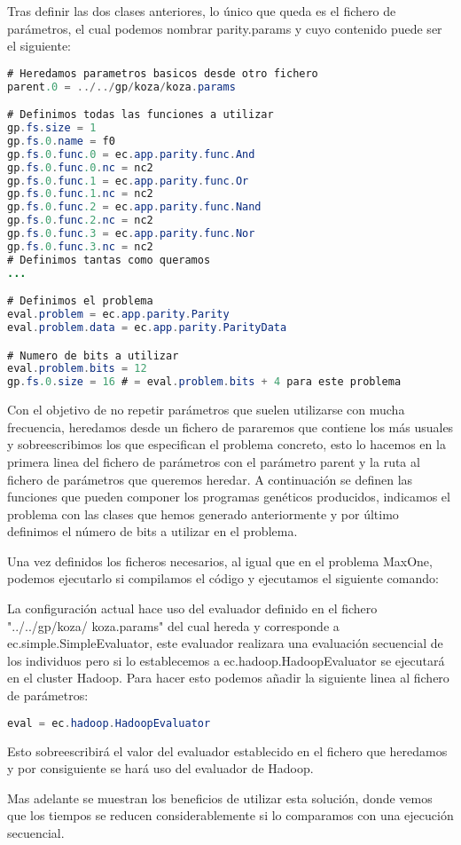 Tras definir las dos clases anteriores, lo único que queda es el fichero de parámetros, el cual podemos nombrar parity.params y cuyo contenido puede ser el siguiente:

\begin{lstlisting}[language=Java]
# Heredamos parametros basicos desde otro fichero
parent.0 = ../../gp/koza/koza.params

# Definimos todas las funciones a utilizar
gp.fs.size = 1
gp.fs.0.name = f0
gp.fs.0.func.0 = ec.app.parity.func.And
gp.fs.0.func.0.nc = nc2
gp.fs.0.func.1 = ec.app.parity.func.Or
gp.fs.0.func.1.nc = nc2
gp.fs.0.func.2 = ec.app.parity.func.Nand
gp.fs.0.func.2.nc = nc2
gp.fs.0.func.3 = ec.app.parity.func.Nor
gp.fs.0.func.3.nc = nc2
# Definimos tantas como queramos
...

# Definimos el problema
eval.problem = ec.app.parity.Parity
eval.problem.data = ec.app.parity.ParityData

# Numero de bits a utilizar
eval.problem.bits = 12
gp.fs.0.size = 16 # = eval.problem.bits + 4 para este problema
\end{lstlisting}

Con el objetivo de no repetir parámetros que suelen utilizarse con mucha frecuencia, heredamos desde un fichero de pararemos que contiene los m\'as usuales y sobreescribimos los que especifican el problema concreto, esto lo hacemos en la primera linea del fichero de parámetros con el parámetro parent y la ruta al fichero de parámetros que queremos heredar. A continuación se definen las funciones que pueden componer los programas genéticos producidos, indicamos el problema con las clases que hemos generado anteriormente y por \'ultimo definimos el n\'umero de bits a utilizar en el problema.

Una vez definidos los ficheros necesarios, al igual que en el problema MaxOne, podemos ejecutarlo si compilamos el código y ejecutamos el siguiente comando:


La configuración actual hace uso del evaluador definido en el fichero "../../gp/koza/ koza.params" del cual hereda y corresponde a ec.simple.SimpleEvaluator, este evaluador realizara una evaluación secuencial de los individuos pero si lo establecemos a ec.hadoop.HadoopEvaluator se ejecutar\'a en el cluster Hadoop. Para hacer esto podemos a\~nadir la siguiente linea al fichero de parámetros:

\begin{lstlisting}[language=Java]
eval = ec.hadoop.HadoopEvaluator
\end{lstlisting}

Esto sobreescribir\'a el valor del evaluador establecido en el fichero que heredamos y por consiguiente se hará uso del evaluador de Hadoop.

Mas adelante  se muestran los beneficios de utilizar esta solución, donde vemos que los tiempos se reducen considerablemente si lo comparamos con una ejecución secuencial.